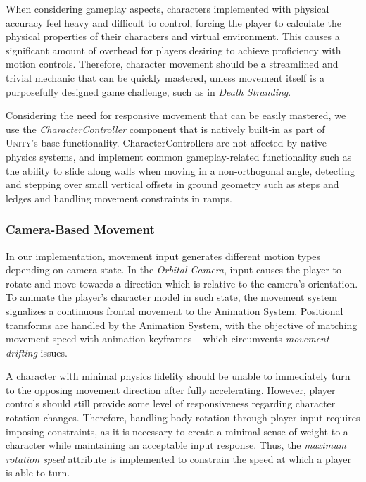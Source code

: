 When considering gameplay aspects, characters implemented with physical accuracy feel heavy and difficult to control, forcing the player to calculate the physical properties of their characters and virtual environment. This causes a significant amount of overhead for players desiring to achieve proficiency with motion controls. Therefore, character movement should be a streamlined and trivial mechanic that can be quickly mastered, unless movement itself is a purposefully designed game challenge, such as in \emph{Death Stranding}.

Considering the need for responsive movement that can be easily mastered, we use the \emph{CharacterController} component that is natively built-in as part of \textsc{Unity}'s base functionality. CharacterControllers are not affected by native physics systems, and implement common gameplay-related functionality such as the ability to slide along walls when moving in a non-orthogonal angle, detecting and stepping over small vertical offsets in ground geometry such as steps and ledges and handling movement constraints in ramps.

\subsubsection{Camera-Based Movement}

In our implementation, movement input generates different motion types depending on camera state. In the \emph{Orbital Camera}, input causes the player to rotate and move towards a direction which is relative to the camera's orientation. To animate the player's character model in such state, the movement system signalizes a continuous frontal movement to the Animation System. Positional transforms are handled by the Animation System, with the objective of matching movement speed with animation keyframes -- which circumvents \emph{movement drifting} issues.

A character with minimal physics fidelity should be unable to immediately turn to the opposing movement direction after fully accelerating. However, player controls should still provide some level of responsiveness regarding character rotation changes. Therefore, handling body rotation through player input requires imposing constraints, as it is necessary to create a minimal sense of weight to a character while maintaining an acceptable input response. Thus, the \emph{maximum rotation speed} attribute is implemented to constrain the speed at which a player is able to turn.

